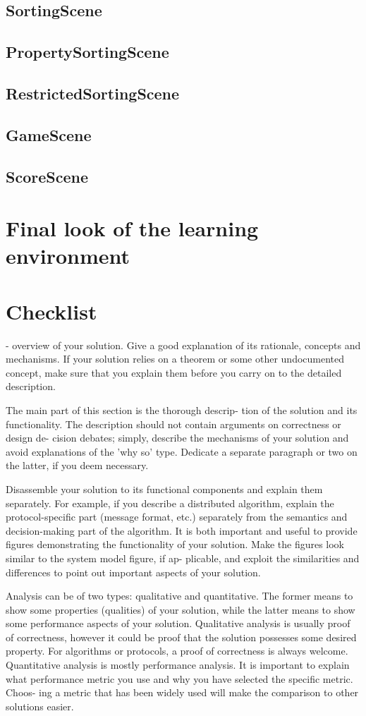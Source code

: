 \subsection{SortingScene}
\subsection{PropertySortingScene}
\subsection{RestrictedSortingScene}
\subsection{GameScene}
\subsection{ScoreScene}


\section{Final look of the learning environment}


\section{Checklist}

- overview of your solution. Give a good explanation of its rationale,
concepts and mechanisms. If your solution relies on a
theorem or some other undocumented concept, make sure
that you explain them before you carry on to the detailed
description.

The main part of this section is the thorough descrip-
tion of the solution and its functionality.
The description should not contain arguments on correctness or design de-
cision debates; simply, describe the mechanisms of your
solution and avoid explanations of the 'why so' type.
Dedicate a separate paragraph or two on the latter, if
you deem necessary.

Disassemble your solution to its functional components
and explain them separately. For example, if you describe
a distributed algorithm, explain the protocol-specific part
(message format, etc.) separately from the semantics and
decision-making part of the algorithm.
It is both important and useful to provide figures
demonstrating the functionality of your solution. Make
the figures look similar to the system model figure, if ap-
plicable, and exploit the similarities and differences to
point out important aspects of your solution.

Analysis can be of two types: qualitative and quantitative.
The former means to show some properties (qualities)
of your solution, while the latter means to show some
performance aspects of your solution.
Qualitative analysis is usually proof of correctness,
however it could be proof that the solution possesses some
desired property. For algorithms or protocols, a proof of
correctness is always welcome.
Quantitative analysis is mostly performance analysis.
It is important to explain what performance metric you
use and why you have selected the specific metric. Choos-
ing a metric that has been widely used will make the
comparison to other solutions easier.

